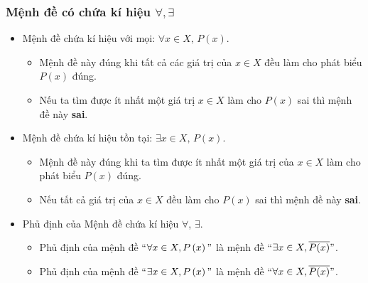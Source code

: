 \subsubsection{Mệnh đề có chứa kí hiệu $\forall, \exists$}
	\begin{itemize}
		\item[\iconMT] Mệnh đề chứa kí hiệu với mọi: $\forall x \in X,\, P(x) $.
	\begin{note}
		\begin{itemize}
			\item Mệnh đề này đúng khi tất cả các giá trị của $x \in X$ đều làm cho phát biểu $P(x)$ đúng.
			\item Nếu ta tìm được ít nhất một giá trị $x \in X$ làm cho $P(x)$ sai thì mệnh đề này \textbf{sai}.
		\end{itemize}
	\end{note}
		\item[\iconMT] Mệnh đề chứa kí hiệu tồn tại: $\exists x \in X,\, P(x) $.
	\begin{note}
		\begin{itemize}
			\item Mệnh đề này đúng khi ta tìm được ít nhất một giá trị của $x \in X$ làm cho phát biểu $P(x)$ đúng.
			\item Nếu tất cả giá trị của $x \in X$ đều làm cho $P(x)$ sai thì mệnh đề này \textbf{sai}.
		\end{itemize}
	\end{note}
		\item[\iconMT] Phủ định của Mệnh đề chứa kí hiệu $\forall $, $\exists $.
	\begin{note}
		\begin{itemize}
			\item Phủ định của mệnh đề ``$\forall x\in X,P\left( x \right)"$ là mệnh đề ``$\exists x\in X,\overline{P(x)}"$.
			\item Phủ định của mệnh đề ``$\exists x\in X,P\left( x \right)"$ là mệnh đề ``$\forall x\in X,\overline{P(x)}"$.
		\end{itemize}
	\end{note}
	\end{itemize}

